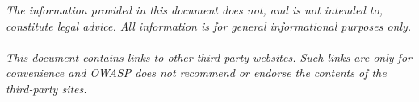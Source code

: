 
\textit{The information provided in this document does not, and is not intended
to, constitute legal advice. All information is for general informational
purposes only.\\
\\
This document contains links to other third-party websites. Such links are only
for convenience and OWASP does not recommend or endorse the contents of the
third-party sites.
}